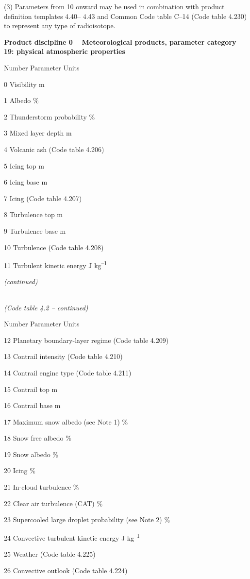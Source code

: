 (3) Parameters from 10 onward may be used in combination with product definition templates 4.40-- 4.43 and Common Code table C--14 (Code table 4.230) to represent any type of radioisotope.

\textbf{Product discipline 0 -- Meteorological products, parameter category 19: physical atmospheric properties}

Number Parameter Units

0 Visibility m

1 Albedo \%

2 Thunderstorm probability \%

3 Mixed layer depth m

4 Volcanic ash (Code table 4.206)

5 Icing top m

6 Icing base m

7 Icing (Code table 4.207)

8 Turbulence top m

9 Turbulence base m

10 Turbulence (Code table 4.208)

11 Turbulent kinetic energy J kg\textsuperscript{--1}

\emph{(continued)}

\emph{\\
(Code table 4.2 -- continued)}

Number Parameter Units

12 Planetary boundary-layer regime (Code table 4.209)

13 Contrail intensity (Code table 4.210)

14 Contrail engine type (Code table 4.211)

15 Contrail top m

16 Contrail base m

17 Maximum snow albedo (see Note 1) \%

18 Snow free albedo \%

19 Snow albedo \%

20 Icing \%

21 In-cloud turbulence \%

22 Clear air turbulence (CAT) \%

23 Supercooled large droplet probability (see Note 2) \%

24 Convective turbulent kinetic energy J kg\textsuperscript{--1}

25 Weather (Code table 4.225)

26 Convective outlook (Code table 4.224)

